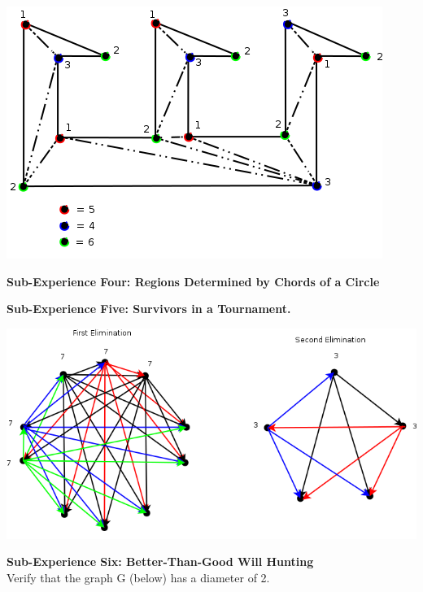 \documentclass[10pt,a4paper]{report}
\begin{document}
		\begin{center}
			\includegraphics[scale=.5]{e3.png}
			\newline
			\newline
		\end{center}
	\textbf{Sub-Experience Four: Regions Determined by Chords of a Circle}\\
	
		\begin{center}
	
		\end{center}
	\textbf{Sub-Experience Five: Survivors in a Tournament.}\\
	
		\begin{center}
			\includegraphics[scale=.5]{e5.png}
			\newline
			\newline
		\end{center}
	\textbf{Sub-Experience Six: Better-Than-Good Will Hunting}\\
		Verify that the graph G (below) has a diameter of 2.
	
\end{document}
